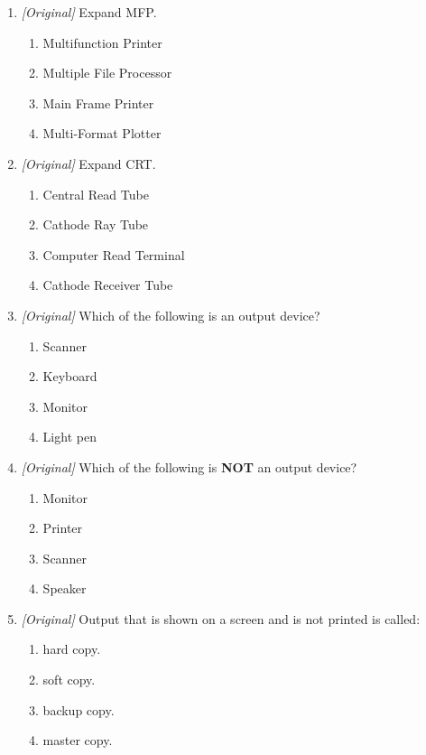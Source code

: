 \begin{enumerate}[label=\textbf{Q\arabic*.}, leftmargin=*]
\end{enumerate}
\begin{enumerate}[label=\textbf{Q\arabic*.}, leftmargin=*]
\item \textit{[Original]} Expand MFP.
  \begin{enumerate}[label=\Alph*.]
    \item Multifunction Printer
    \item Multiple File Processor
    \item Main Frame Printer
    \item Multi-Format Plotter
  \end{enumerate}
\item \textit{[Original]} Expand CRT.
  \begin{enumerate}[label=\Alph*.]
    \item Central Read Tube
    \item Cathode Ray Tube
    \item Computer Read Terminal
    \item Cathode Receiver Tube
  \end{enumerate}
\item \textit{[Original]} Which of the following is an output device?
  \begin{enumerate}[label=\Alph*.]
    \item Scanner
    \item Keyboard
    \item Monitor
    \item Light pen
  \end{enumerate}
\item \textit{[Original]} Which of the following is \textbf{NOT} an output
  device?
  \begin{enumerate}[label=\Alph*.]
    \item Monitor
    \item Printer
    \item Scanner
    \item Speaker
  \end{enumerate}
\item \textit{[Original]} Output that is shown on a screen and is not printed
  is called:
  \begin{enumerate}[label=\Alph*.]
    \item hard copy.
    \item soft copy.
    \item backup copy.
    \item master copy.

\end{enumerate}
\end{enumerate}
